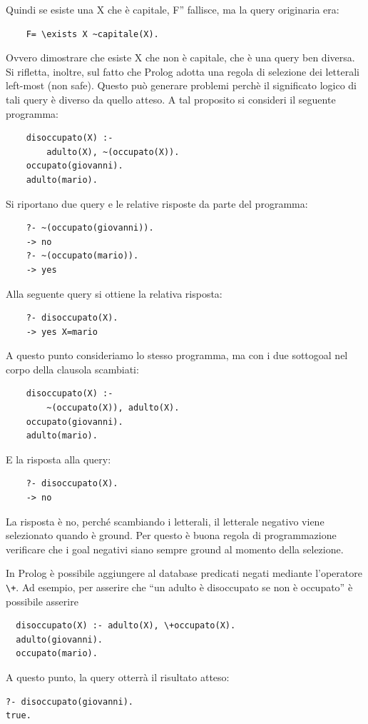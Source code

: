 \documentclass[answers, a4paper, 11pt]{exam}
\begin{document}
\begin{questions}
\begin{solution}
  Quindi se esiste una X che è capitale, F'' fallisce, ma la query originaria era:
  \begin{verbatim}
    F= \exists X ~capitale(X).
  \end{verbatim}
  Ovvero dimostrare che esiste X che non è capitale, che è una query ben diversa.
  Si rifletta, inoltre, sul fatto che Prolog adotta una regola di selezione dei letterali left-most (non safe). Questo può generare problemi perchè il significato logico di tali query è diverso da quello atteso.
  A tal proposito si consideri il seguente programma:
  \begin{verbatim}
    disoccupato(X) :- 
        adulto(X), ~(occupato(X)).
    occupato(giovanni).
    adulto(mario).
  \end{verbatim}
  Si riportano due query e le relative risposte da parte del programma:
  \begin{verbatim}
    ?- ~(occupato(giovanni)).
    -> no
    ?- ~(occupato(mario)).
    -> yes
  \end{verbatim}
  Alla seguente query si ottiene la relativa risposta:
  \begin{verbatim}
    ?- disoccupato(X).
    -> yes X=mario
  \end{verbatim}
  A questo punto consideriamo lo stesso programma, ma con i due sottogoal nel corpo della clausola scambiati:
  \begin{verbatim}
    disoccupato(X) :- 
        ~(occupato(X)), adulto(X).
    occupato(giovanni).
    adulto(mario).
  \end{verbatim}
  E la risposta alla query:
  \begin{verbatim}
    ?- disoccupato(X).
    -> no
  \end{verbatim}
  La risposta è no, perché scambiando i letterali, il letterale negativo viene selezionato quando è ground.
  Per questo è buona regola di programmazione verificare che i goal negativi siano sempre ground al momento della selezione.


  In Prolog è possibile aggiungere al database predicati negati mediante l'operatore \texttt{\textbackslash +}. 
  Ad esempio, per asserire che ``un adulto è disoccupato se non è occupato'' è possibile asserire 
  \begin{verbatim}
  disoccupato(X) :- adulto(X), \+occupato(X).
  adulto(giovanni).
  occupato(mario).
  \end{verbatim}
  A questo punto, la query otterrà il risultato atteso:
  \begin{verbatim}
?- disoccupato(giovanni).
true.


\end{verbatim}
\end{solution}
\end{questions}
\end{document}
